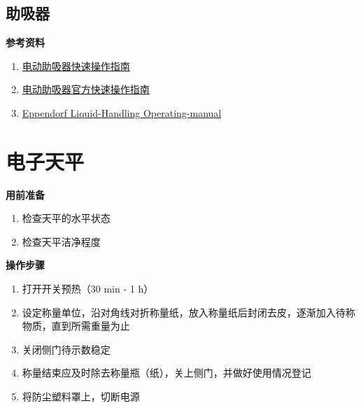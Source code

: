 \documentclass[
]{book}
\providecommand{\tightlist}{%
  \setlength{\itemsep}{0pt}\setlength{\parskip}{0pt}}
\begin{document}
\hypertarget{ux52a9ux5438ux5668}{%
\subsection{助吸器}\label{ux52a9ux5438ux5668}}

\textbf{参考资料}

\begin{enumerate}
\def\labelenumi{\arabic{enumi}.}
\tightlist
\item
  \href{http://www.sccos.cn/9.pdf}{电动助吸器快速操作指南}
\item
  \href{https://www.eppendorf.com/product-media/doc/en/166659_Short-Instructions/Eppendorf_Liquid-Handling_Short-instructions_Easypet-3_Easypet-3.pdf?_ga=2.144546805.1938597545.1659465477-672298651.1659375433}{电动助吸器官方快速操作指南}
\item
  \href{https://www.eppendorf.com/product-media/doc/zh/166652_Operating-Manual/Eppendorf_Liquid-Handling_Operating-manual_Easypet-3_Easypet-3.pdf?_ga=2.115859398.1938597545.1659465477-672298651.1659375433}{Eppendorf
  Liquid-Handling Operating-manual}
\end{enumerate}

\hypertarget{ux7535ux5b50ux5929ux5e73}{%
\section{电子天平}\label{ux7535ux5b50ux5929ux5e73}}

\textbf{用前准备}

\begin{enumerate}
\def\labelenumi{\arabic{enumi}.}
\tightlist
\item
  检查天平的水平状态
\item
  检查天平洁净程度
\end{enumerate}

\textbf{操作步骤}

\begin{enumerate}
\def\labelenumi{\arabic{enumi}.}
\tightlist
\item
  打开开关预热（30 min - 1 h）
\item
  设定称量单位，沿对角线对折称量纸，放入称量纸后封闭去皮，逐渐加入待称物质，直到所需重量为止
\item
  关闭侧门待示数稳定
\item
  称量结束应及时除去称量瓶（纸），关上侧门，并做好使用情况登记
\item
  将防尘塑料罩上，切断电源
\end{enumerate}
\end{document}
